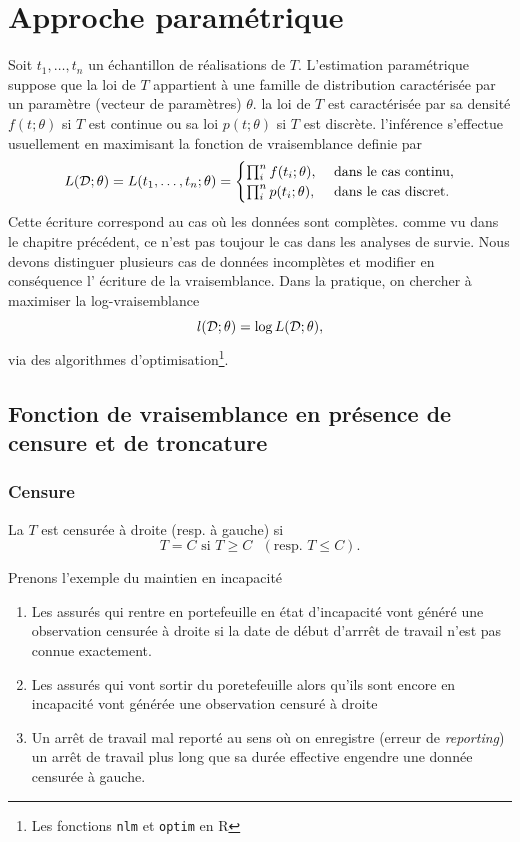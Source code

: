 \chapter{Approche paramétrique}\label{chap:parametric}
Soit $t_1,\ldots, t_n$ un échantillon de réalisations \iid de $T$. L'estimation paramétrique suppose que la loi de $T$ appartient à une famille de distribution caractérisée par un paramètre (vecteur de paramètres) $\theta$. la loi de $T$ est caractérisée par sa densité $f(t;\theta)$ si $T$ est continue ou sa loi $p(t;\theta)$ si $T$ est discrète. l'inférence s'effectue usuellement en maximisant la fonction de vraisemblance definie par 
$$
L(\mathcal{D};\theta) = L(t_1,\ldots, t_n;\theta) = \begin{cases}
\prod_{i}^nf(t_i;\theta),&\text{ dans le cas continu},\\
\prod_{i}^np(t_i;\theta),&\text{ dans le cas discret}.
\end{cases}
$$
Cette écriture correspond au cas où les données sont complètes. comme vu dans le chapitre précédent, ce n'est pas toujour le cas dans les analyses de survie. Nous devons distinguer plusieurs cas de données incomplètes et modifier en conséquence l' écriture de la vraisemblance. Dans la pratique, on chercher à maximiser la log-vraisemblance 
$$
l(\mathcal{D};\theta)=\log L(\mathcal{D};\theta),
$$
via des algorithmes d'optimisation\footnote{Les fonctions \texttt{nlm} et \texttt{optim} en R}.

\section{Fonction de vraisemblance en présence de censure et de troncature}\label{sec:like}
\subsection{Censure}
\begin{definition}\label{def:censure_tronquature}
La \va $T$ est censurée à droite (resp. à gauche) si 
$$
T = C \text{ si }T\geq C\text{ } (\text{resp. } T\leq C).
$$
\end{definition}
\begin{ex}
Prenons l'exemple du maintien en incapacité
\begin{enumerate}
\item Les assurés qui rentre en portefeuille en état d'incapacité vont généré une observation censurée à droite si la date de début d'arrrêt de travail n'est pas connue exactement. 
\item Les assurés qui vont sortir du poretefeuille alors qu'ils sont encore en incapacité vont générée une observation censuré à droite
\item Un arrêt de travail mal reporté au sens où on enregistre (erreur de \textit{reporting}) un arrêt de travail plus long que sa durée effective engendre une donnée censurée à gauche. 
\end{enumerate}
\end{ex}

